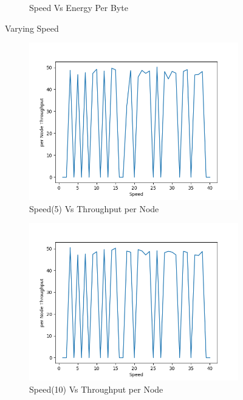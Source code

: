 \begin{figure}[h]
\begin{subfigure}{.5\textwidth}
     \caption{Speed Vs Energy Per Byte}
     \label{speed_energy_mobile_per_byte}
\end{subfigure}
\caption{Varying Speed}
\label{fig:varyingSpeed}
\end{figure}
\begin{figure}[h]
\begin{subfigure}{.5\textwidth}
  \centering
  \includegraphics[width=.8\linewidth]{_11_2_mobile/Speed(5)vsperNodeThroughput.png}
     \caption{Speed(5) Vs Throughput per Node}
 \end{subfigure}
\begin{subfigure}{.5\textwidth}
  \centering
  \includegraphics[width=.8\linewidth]{_11_2_mobile/Speed(10)vsperNodeThroughput.png}
     \caption{Speed(10) Vs Throughput per Node}
    \end{subfigure}
\begin{subfigure}{.5\textwidth}
    \centering

\end{subfigure}
\end{figure}
